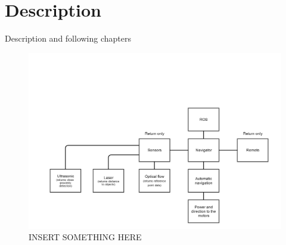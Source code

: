 \section{Description}

Description and following chapters 

\begin{figure}[H]
	\centering
	\includegraphics[width=1\linewidth]{images/prototype-diagram.jpg}
	\caption{INSERT SOMETHING HERE}
\end{figure}